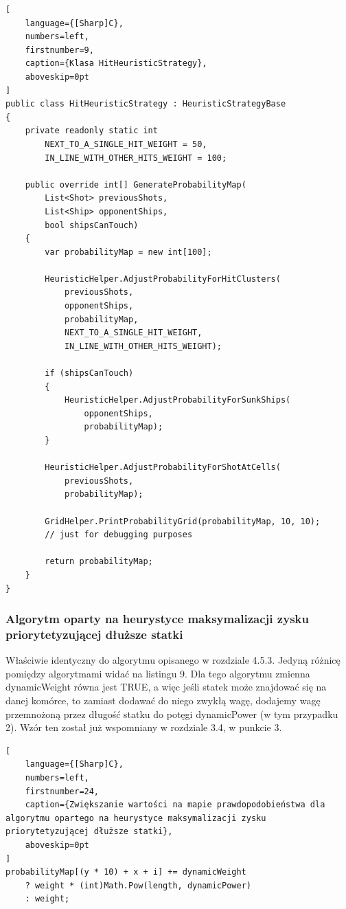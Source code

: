 \begin{addmargin}[10mm]{0mm}
\begin{lstlisting}[
    language={[Sharp]C},
    numbers=left,
    firstnumber=9,
    caption={Klasa HitHeuristicStrategy},
    aboveskip=0pt
]
public class HitHeuristicStrategy : HeuristicStrategyBase
{
    private readonly static int
        NEXT_TO_A_SINGLE_HIT_WEIGHT = 50,
        IN_LINE_WITH_OTHER_HITS_WEIGHT = 100;

    public override int[] GenerateProbabilityMap(
        List<Shot> previousShots,
        List<Ship> opponentShips,
        bool shipsCanTouch)
    {
        var probabilityMap = new int[100];

        HeuristicHelper.AdjustProbabilityForHitClusters(
            previousShots,
            opponentShips,
            probabilityMap,
            NEXT_TO_A_SINGLE_HIT_WEIGHT,
            IN_LINE_WITH_OTHER_HITS_WEIGHT);

        if (shipsCanTouch)
        {
            HeuristicHelper.AdjustProbabilityForSunkShips(
                opponentShips,
                probabilityMap);
        }

        HeuristicHelper.AdjustProbabilityForShotAtCells(
            previousShots,
            probabilityMap);

        GridHelper.PrintProbabilityGrid(probabilityMap, 10, 10);
        // just for debugging purposes

        return probabilityMap;
    }
}

\end{lstlisting}
\end{addmargin}

\subsubsection{Algorytm oparty na heurystyce maksymalizacji zysku priorytetyzującej dłuższe statki}
Właściwie identyczny do algorytmu opisanego w rozdziale 4.5.3. Jedyną różnicę pomiędzy algorytmami widać na listingu 9. Dla tego algorytmu zmienna dynamicWeight równa jest TRUE, a więc jeśli statek może znajdować się na danej komórce, to zamiast dodawać do niego zwykłą wagę, dodajemy wagę przemnożoną przez długość statku do potęgi dynamicPower (w tym przypadku 2). Wzór ten został już wspomniany w rozdziale 3.4, w punkcie 3.

\begin{addmargin}[10mm]{0mm}
\begin{lstlisting}[
    language={[Sharp]C},
    numbers=left,
    firstnumber=24,
    caption={Zwiększanie wartości na mapie prawdopodobieństwa dla algorytmu opartego na heurystyce maksymalizacji zysku priorytetyzującej dłuższe statki},
    aboveskip=0pt
]
probabilityMap[(y * 10) + x + i] += dynamicWeight
    ? weight * (int)Math.Pow(length, dynamicPower)
    : weight;
\end{lstlisting}
\end{addmargin}

